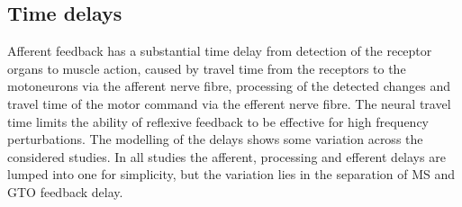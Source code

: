 




\subsection{Time delays}
\label{sec:ass_afferent_delay}
Afferent feedback has a substantial time delay from detection of the receptor organs to muscle action, caused by travel time from the receptors to the motoneurons via the afferent nerve fibre, processing of the detected changes and travel time of the motor command via the efferent nerve fibre. The neural travel time limits the ability of reflexive feedback to be effective for high frequency perturbations. The modelling of the delays shows some variation across the considered studies. In all studies the afferent, processing and efferent delays are lumped into one for simplicity, but the variation lies in the separation of MS and GTO feedback delay.

